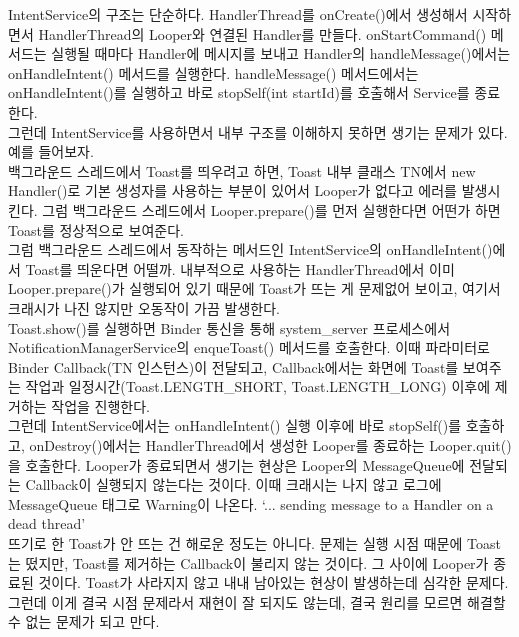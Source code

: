 IntentService의 구조는 단순하다.  HandlerThread를 onCreate()에서 생성해서 시작하면서 HandlerThread의 Looper와 연결된 Handler를 만들다.
onStartCommand() 메서드는 실행될 때마다 Handler에 메시지를 보내고 Handler의 handleMessage()에서는 onHandleIntent() 메서드를 실행한다.
handleMessage() 메서드에서는 onHandleIntent()를 실행하고 바로 stopSelf(int startId)를 호출해서 Service를 종료한다.\\

그런데 IntentService를 사용하면서 내부 구조를 이해하지 못하면 생기는 문제가 있다. 예를 들어보자.\\

백그라운드 스레드에서 Toast를 띄우려고 하면, Toast 내부 클래스 TN에서 new Handler()로 기본 생성자를 사용하는 부분이 있어서 Looper가 없다고 에러를 발생시킨다. 
그럼 백그라운드 스레드에서 Looper.prepare()를 먼저 실행한다면 어떤가 하면 Toast를 정상적으로 보여준다.\\

그럼 백그라운드 스레드에서 동작하는 메서드인 IntentService의 onHandleIntent()에서 Toast를 띄운다면 어떨까. 
내부적으로 사용하는 HandlerThread에서 이미 Looper.prepare()가 실행되어 있기 때문에 Toast가 뜨는 게 문제없어 보이고, 여기서 크래시가 나진 않지만 오동작이 가끔 발생한다.\\

Toast.show()를 실행하면 Binder 통신을 통해 system\_server 프로세스에서 NotificationManagerService의 enqueToast() 메서드를 호출한다. 이때 파라미터로 Binder Callback(TN 인스턴스)이 전달되고, Callback에서는 화면에 Toast를 보여주는 작업과 일정시간(Toast.LENGTH\_SHORT, Toast.LENGTH\_LONG) 이후에 제거하는 작업을 진행한다.\\

그런데 IntentService에서는 onHandleIntent() 실행 이후에 바로 stopSelf()를 호출하고, onDestroy()에서는 HandlerThread에서 생성한 Looper를 종료하는 Looper.quit()을 호출한다. Looper가 종료되면서 생기는 현상은 Looper의 MessageQueue에 전달되는 Callback이 실행되지 않는다는 것이다.
이때 크래시는 나지 않고 로그에 MessageQueue 태그로 Warning이 나온다. `... sending message to a Handler on a dead thread'\\

뜨기로 한 Toast가 안 뜨는 건 해로운 정도는 아니다. 문제는 실행 시점 때문에 Toast는 떴지만, Toast를 제거하는 Callback이 불리지 않는 것이다. 그 사이에 Looper가 종료된 것이다.
Toast가 사라지지 않고 내내 남아있는 현상이 발생하는데 심각한 문제다. 
그런데 이게 결국 시점 문제라서 재현이 잘 되지도 않는데, 결국 원리를 모르면 해결할 수 없는 문제가 되고 만다.\\

